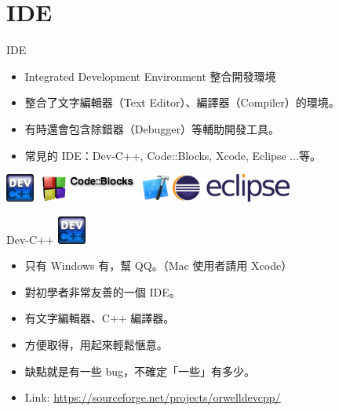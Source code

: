 \documentclass[t]{beamer}
\begin{document}
\section{IDE}
\begin{frame}{IDE}
  \begin{itemize}
    \item Integrated Development Environment 整合開發環境
    \item 整合了文字編輯器（Text Editor）、編譯器（Compiler）的環境。
    \item 有時還會包含除錯器（Debugger）等輔助開發工具。
    \item 常見的 IDE：Dev-C++, Code::Blocks, Xcode, Eclipse ...等。
  \end{itemize}
  \begin{center}
    \includegraphics[height=2.5em]{image/dev.png}
    \hspace{1em}
    \includegraphics[height=2.5em]{image/cb.png}
    \hspace{1em}
    \includegraphics[height=2.5em]{image/xcode.png}
    \hspace{1em}
    \includegraphics[height=2.5em]{image/eclipse.png}
  \end{center}
\end{frame}

\begin{frame}{Dev-C++}
  \vspace{0.5em}
  \hspace{2em}
  \includegraphics[height=2.5em]{image/dev.png}
  \vspace{0.5em}
  \begin{itemize}
    \item 只有 Windows 有，幫 QQ。（Mac 使用者請用 Xcode）
    \item 對初學者非常友善的一個 IDE。
    \item 有文字編輯器、C++ 編譯器。
    \item 方便取得，用起來輕鬆愜意。
    \item 缺點就是有一些 bug，不確定「一些」有多少。
    \item Link: \href{https://sourceforge.net/projects/orwelldevcpp/}{\underline{https://sourceforge.net/projects/orwelldevcpp/}}
  \end{itemize}
\end{frame}
\end{document}
